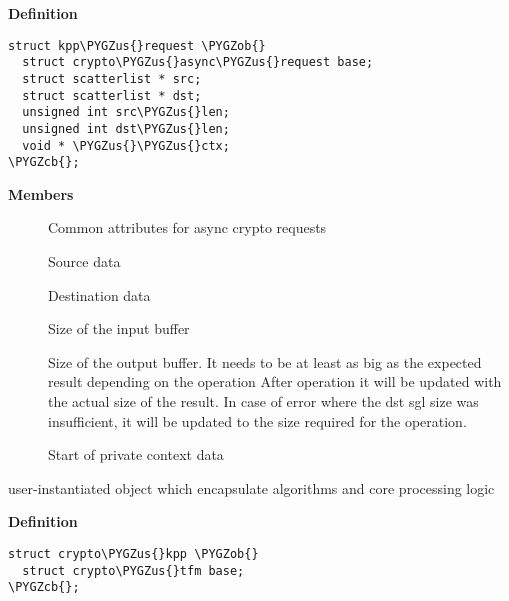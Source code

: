 \documentclass[a4paper,8pt,english]{sphinxmanual}
\def\PYGZus{\char`\_}
\def\PYGZob{\char`\{}
\def\PYGZcb{\char`\}}
\begin{document}
\textbf{Definition}

\begin{Verbatim}[commandchars=\\\{\}]
struct kpp\PYGZus{}request \PYGZob{}
  struct crypto\PYGZus{}async\PYGZus{}request base;
  struct scatterlist * src;
  struct scatterlist * dst;
  unsigned int src\PYGZus{}len;
  unsigned int dst\PYGZus{}len;
  void * \PYGZus{}\PYGZus{}ctx;
\PYGZcb{};
\end{Verbatim}

\textbf{Members}
\begin{description}
\item[{}] \leavevmode
Common attributes for async crypto requests

\item[{}] \leavevmode
Source data

\item[{}] \leavevmode
Destination data

\item[{}] \leavevmode
Size of the input buffer

\item[{}] \leavevmode
Size of the output buffer. It needs to be at least
as big as the expected result depending       on the operation
After operation it will be updated with the actual size of the
result. In case of error where the dst sgl size was insufficient,
it will be updated to the size required for the operation.

\item[{}] \leavevmode
Start of private context data

\end{description}

\begin{fulllineitems}
\label{crypto/api-kpp:c.crypto_kpp}
user-instantiated object which encapsulate algorithms and core processing logic

\end{fulllineitems}


\textbf{Definition}

\begin{Verbatim}[commandchars=\\\{\}]
struct crypto\PYGZus{}kpp \PYGZob{}
  struct crypto\PYGZus{}tfm base;
\PYGZcb{};
\end{Verbatim}
\end{document}
